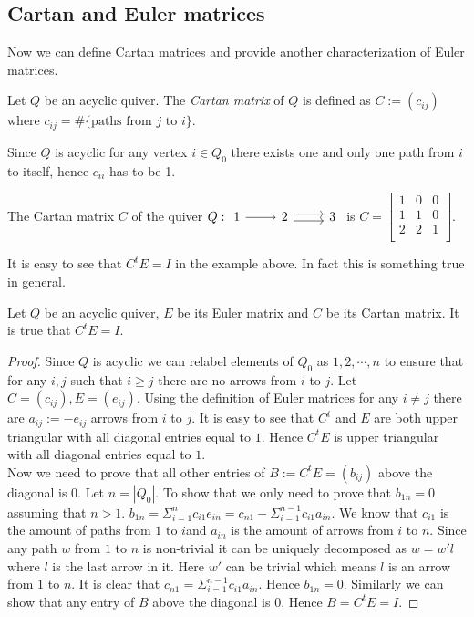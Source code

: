 \subsection{Cartan and Euler matrices}
\indent Now we can define Cartan matrices and provide another characterization of Euler matrices.\\
\begin{definition}
Let $Q$ be an acyclic quiver. The \textit{Cartan matrix} of $Q$ is defined as $C:=(c_{ij})$ where $c_{ij}=\#\{\text{paths from }j\text{ to }i\}$.
\end{definition}
\indent Since $Q$ is acyclic for any vertex $i\in Q_0$ there exists one and only one path from $i$ to itself, hence $c_{ii}$ has to be 1.\\
\begin{example}
The Cartan matrix $C$ of the quiver $Q:\begin{tikzcd}1\arrow[r] & 2\rightdoublearrow & 3\end{tikzcd}$ is $C=\begin{bmatrix}1 & 0 & 0\\1 & 1 & 0 \\2 & 2 & 1\\\end{bmatrix}$.
\end{example}
\indent It is easy to see that $C^tE=I$ in the example above. In fact this is something true in general.\\
\begin{theorem}
Let $Q$ be an acyclic quiver, $E$ be its Euler matrix and $C$ be its Cartan matrix. It is true that $C^tE=I$.
\end{theorem}
\begin{proof}
\indent Since $Q$ is acyclic we can relabel elements of $Q_0$ as $1,2,\cdots, n$ to ensure that for any $i, j$ such that $i\geq j$ there are no arrows from $i$ to $j$. Let $C=(c_{ij}), E=(e_{ij})$. Using the definition of Euler matrices for any $i\neq j$ there are $a_{ij}:=-e_{ij}$ arrows from $i$ to $j$. It is easy to see that $C^t$ and $E$ are both upper triangular with all diagonal entries equal to $1$. Hence $C^tE$ is upper triangular with all diagonal entries equal to $1$.\\
\indent Now we need to prove that all other entries of $B:=C^tE=(b_{ij})$ above the diagonal is $0$. Let $n = |Q_0|$. To show that we only need to prove that $b_{1n}=0$ assuming that $n>1$. $b_{1n}=\Sigma_{i = 1}^nc_{i1}e_{in}=c_{n1}-\Sigma_{i = 1}^{n-1}c_{i1}a_{in}$. We know that $c_{i1}$ is the amount of paths from $1$ to $i$and $a_{in}$ is the amount of arrows from $i$ to $n$. Since any path $w$ from $1$ to $n$ is non-trivial it can be uniquely decomposed as $w=w'l$ where $l$ is the last arrow in it. Here $w'$ can be trivial which means $l$ is an arrow from $1$ to $n$. It is clear that $c_{n1}=\Sigma_{i = 1}^{n-1}c_{i1}a_{in}$. Hence $b_{1n}=0$. Similarly we can show that any entry of $B$ above the diagonal is 0. Hence $B=C^tE=I$.
\end{proof}
